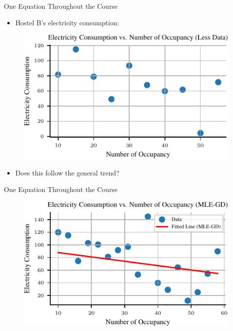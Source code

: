 \documentclass[handout]{beamer}
\begin{document}
    \begin{frame}{One Equation Throughout the Course}
        \begin{itemize}
            \item Hostel B's electricity consumption:
        \end{itemize}
        \begin{figure}
            \includegraphics{../figures/introduction-madhav/mle_bad.pdf}
        \end{figure}
        \begin{itemize}
            \item Does this follow the general trend?
        \end{itemize}
    \end{frame}

    \begin{frame}{One Equation Throughout the Course}
        \begin{figure}
            \includegraphics{../figures/introduction-madhav/mle_bad_fit.pdf}
        \end{figure}
        
    \end{frame}

        
\end{document}

